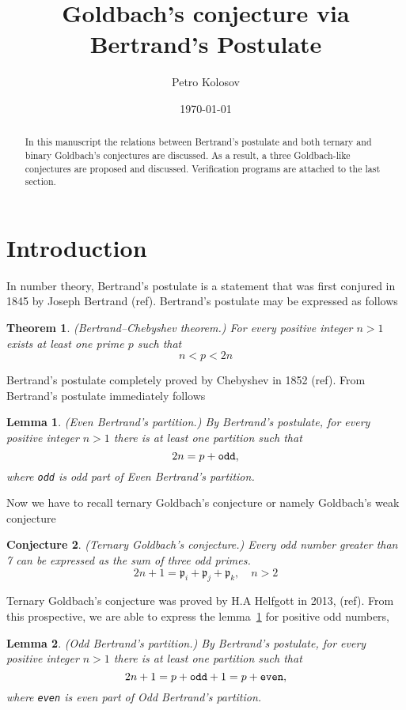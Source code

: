 \documentclass[12pt,letterpaper,oneside,reqno]{amsart}
\title[Goldbach's conjecture via Bertrand's Postulate]{Goldbach's conjecture via Bertrand's Postulate}
\author[Petro Kolosov]{Petro Kolosov}
\date{\today}
\newtheorem{thm}{Theorem}[section]
\newtheorem{lem}{Lemma}[section]
\newtheorem{conj}[thm]{Conjecture}
\begin{document}
    \begin{abstract}
        In this manuscript the relations between Bertrand's postulate and both ternary and binary Goldbach's conjectures
        are discussed.
        As a result, a three Goldbach-like conjectures are proposed and discussed.
        Verification programs are attached to the last section.
    \end{abstract}
    \maketitle


    \section{Introduction} \label{sec:introduction}
    In number theory, Bertrand's postulate is a statement that was first conjured in 1845 by Joseph Bertrand (ref).
    Bertrand's postulate may be expressed as follows
    \begin{thm}
        \label{bertrand_theorem} (Bertrand–Chebyshev theorem.)
        For every positive integer $n>1$ exists at least one prime $p$ such that
        \[
            n < p < 2n
        \]
    \end{thm}
    Bertrand's postulate completely proved by Chebyshev in 1852 (ref).
    From Bertrand's postulate immediately follows
    \begin{lem}
        \label{bertrands_partition_lemma} (Even Bertrand's partition.)
        By Bertrand's postulate, for every positive integer $n>1$ there is at least one partition such that
        \[
            2n = p + \verb!odd!,
        \]
        where \verb!odd! is odd part of Even Bertrand's partition.
    \end{lem}
    Now we have to recall ternary Goldbach's conjecture or namely Goldbach's weak conjecture
    \begin{conj}
        \label{ternary_goldbach_conjecture} (Ternary Goldbach's conjecture.)
        Every odd number greater than 7 can be expressed as the sum of three odd primes.
        \[
            2n+1 = \mathfrak{p}_i +  \mathfrak{p}_j + \mathfrak{p}_k, \quad n > 2
        \]
    \end{conj}
    Ternary Goldbach's conjecture was proved by H.A Helfgott in 2013, (ref).
    From this prospective, we are able to express the lemma~\ref{bertrands_partition_lemma} for positive odd numbers,
    \begin{lem}(Odd Bertrand's partition.)
        \label{bertrands_odd_partition_lemma}
        By Bertrand's postulate, for every positive integer $n>1$ there is at least one partition such that
        \[
            2n + 1 = p + \verb!odd! + 1 = p + \verb!even!,
        \]
        where \verb!even! is even part of Odd Bertrand's partition.
    \end{lem}
\end{document}
